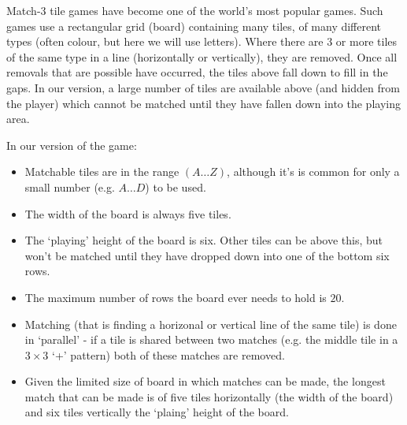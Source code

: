 
Match-3 tile games have become one of the world's most popular games.
Such games use a rectangular grid (board)
containing many tiles, of many different types
(often colour, but here we will use letters). Where there are $3$ or
more tiles of the same type in a line (horizontally or vertically),
they are removed. Once all removals that are possible have occurred,
the tiles above fall down to fill in the gaps. In our version, a large
number of tiles are available above (and hidden from the player) which
cannot be matched until they have fallen down into the playing area.

In our version of the game:
\begin{itemize}
\item Matchable tiles are in the range $(A \ldots Z)$,
although it's is common for only a small
number (e.g. $A \ldots D$) to be used.
\item The width of the board is always five tiles.
\item The `playing' height of the board is six. Other tiles can be above this,
but won't be matched until they have dropped down into one of the bottom six rows.
\item The maximum number of rows the board ever needs to hold is $20$. 
\item Matching (that is finding a horizonal or vertical line of the same tile)
is done in `parallel' - if a tile is shared between two matches
(e.g. the middle tile in a $3\times 3$ `+' pattern) both of these matches are
removed.
\item Given the limited size of board in which matches can be made, the longest
match that can be made is of five tiles horizontally (the width of the board) and
six tiles vertically the `plaing' height of the board.
\end{itemize}

